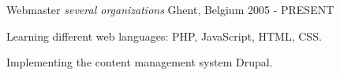 \begin{cventries}
  \cventry
    {Webmaster} %
    {\emph{several organizations}} %
    {Ghent, Belgium} %
    {2005 - PRESENT} %
    {
      \begin{cvitems} %
        \item {Learning different web languages: PHP, JavaScript, HTML, CSS.}
        \item {Implementing the content management system Drupal.}
      \end{cvitems}
    }

\end{cventries}

